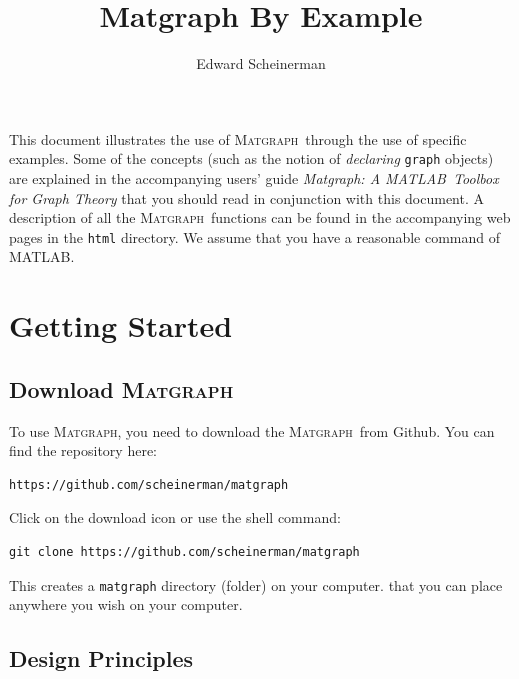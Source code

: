 \documentclass[12pt]{amsart}
\title{Matgraph By Example}
\author{Edward Scheinerman}
\date{\superdate}
\newcommand\matlab{MATLAB}
\newcommand\matgraph{\textsc{Matgraph}}
\begin{document}
\maketitle


This document illustrates the use of \matgraph\ through the use of
specific examples. Some of the concepts (such as the notion of
\emph{declaring} \verb|graph| objects) are explained in the
accompanying users' guide \emph{Matgraph: A \matlab\ Toolbox for Graph
  Theory} that you should read in conjunction with this document. A
description of all the \matgraph\ functions can be found in the
accompanying web pages in the \verb|html| directory.  We assume that
you have a reasonable command of \matlab.

\section{Getting Started}


\subsection{Download \matgraph}
\label{sect:download}
To use \matgraph, you need to download the \matgraph\ 
from Github. You can find the repository here:
\begin{verbatim}
https://github.com/scheinerman/matgraph
\end{verbatim}
Click on the download icon or use the shell command:
\begin{verbatim}
git clone https://github.com/scheinerman/matgraph
\end{verbatim}
This creates a \verb|matgraph| directory (folder) on your computer.
that you can place anywhere you wish on your computer.


\subsection{Design Principles}
\end{document}
